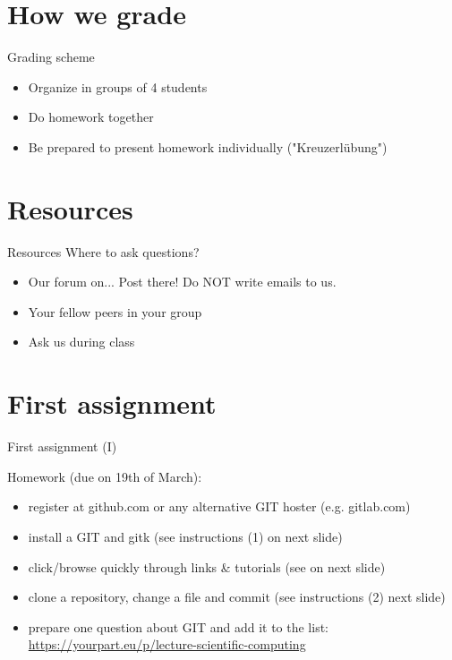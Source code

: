 \documentclass[10pt,color=usenames,dvipsnames]{beamer}
\begin{document}
\section{How we grade}

\begin{frame}{Grading scheme}

	\begin{itemize}
		\item Organize in groups of 4 students	
		\item Do homework together
		\item Be prepared to present homework individually ("Kreuzerlübung")		
	\end{itemize}

\end{frame}

\section{Resources}

\begin{frame}{Resources}
    Where to ask questions?
	\begin{itemize}
		\item Our forum on... Post there! Do NOT write emails to us.
		\item Your fellow peers in your group
		\item Ask us during class
	\end{itemize}
\end{frame}

\section{First assignment}

\begin{frame}{First assignment (I)}


Homework (due on 19th of March):

\begin{itemize}
	
	\item register at github.com or any alternative GIT hoster (e.g. gitlab.com)
	\item install a GIT and gitk (see instructions (1) on next slide)
	\item click/browse quickly through links \& tutorials (see on next slide)
	\item clone a repository, change a file and commit (see instructions (2) next slide)
	\item prepare one question about GIT and add it to the list: \href{https://yourpart.eu/p/lecture-scientific-computing}{https://yourpart.eu/p/lecture-scientific-computing}

\end{itemize}


\end{frame}
\end{document}
